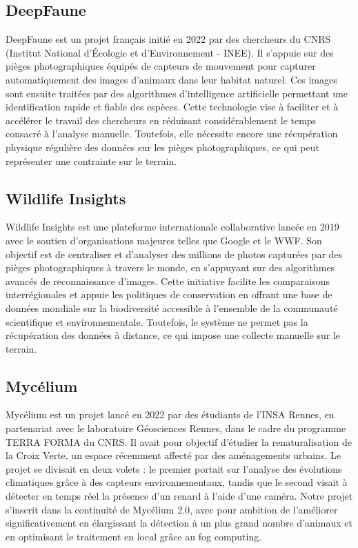 \documentclass[a4paper,11pt]{article}
\begin{document}
	\subsection{DeepFaune}
	DeepFaune est un projet français initié en 2022 par des chercheurs du CNRS (Institut National d’Écologie et d’Environnement - INEE). Il s’appuie sur des pièges photographiques équipés de capteurs de mouvement pour capturer automatiquement des images d’animaux dans leur habitat naturel. Ces images sont ensuite traitées par des algorithmes d’intelligence artificielle permettant une identification rapide et fiable des espèces. Cette technologie vise à faciliter et à accélérer le travail des chercheurs en réduisant considérablement le temps consacré à l’analyse manuelle. Toutefois, elle nécessite encore une récupération physique régulière des données sur les pièges photographiques, ce qui peut représenter une contrainte sur le terrain. \cite{deep}
	\subsection{Wildlife Insights}
	Wildlife Insights est une plateforme internationale collaborative lancée en 2019 avec le soutien d'organisations majeures telles que Google et le WWF. Son objectif est de centraliser et d’analyser des millions de photos capturées par des pièges photographiques à travers le monde, en s’appuyant sur des algorithmes avancés de reconnaissance d’images. Cette initiative facilite les comparaisons interrégionales et appuie les politiques de conservation en offrant une base de données mondiale sur la biodiversité accessible à l’ensemble de la communauté scientifique et environnementale. Toutefois, le système ne permet pas la récupération des données à distance, ce qui impose une collecte manuelle sur le terrain.\cite{wild}
	\subsection{Mycélium}
	Mycélium est un projet lancé en 2022 par des étudiants de l’INSA Rennes, en partenariat avec le laboratoire Géosciences Rennes, dans le cadre du programme TERRA FORMA du CNRS. Il avait pour objectif d’étudier la renaturalisation de la Croix Verte, un espace récemment affecté par des aménagements urbains. Le projet se divisait en deux volets : le premier portait sur l’analyse des évolutions climatiques grâce à des capteurs environnementaux, tandis que le second visait à détecter en temps réel la présence d’un renard à l’aide d’une caméra. Notre projet s’inscrit dans la continuité de Mycélium 2.0, avec pour ambition de l'améliorer significativement en élargissant la détection à un plus grand nombre d'animaux et en optimisant le traitement en local grâce au fog computing.\cite{mycelium}
\end{document}
